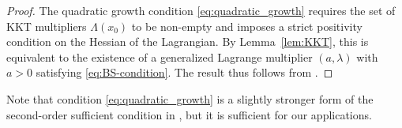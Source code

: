 \documentclass{article}
\newcommand{\1}{\mathds{1}}
\begin{document}
\begin{proof}
 The quadratic growth condition \eqref{eq:quadratic_growth} requires the set of KKT multipliers $\Lambda(x_0)$ to be non-empty and imposes a strict positivity condition on the Hessian of the Lagrangian.
 By Lemma~\ref{lem:KKT}, this is equivalent to the existence of a generalized Lagrange multiplier $(a,\lambda)$ with $a>0$ satisfying \eqref{eq:BS-condition}.
 The result thus follows from \cite[Thm.~3.63 (i)]{bonnans2013perturbation}.
\end{proof}

Note that condition \eqref{eq:quadratic_growth} is a slightly stronger form of the
second-order sufficient condition in \cite[Thm.~3.63 (i)]{bonnans2013perturbation},
but it is sufficient for our applications.




\end{document}
